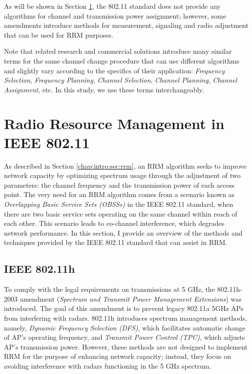 As will be shown in Section \ref{chap:lr:sec:rrm_80211}, the 802.11 standard does not provide any algorithms for channel and transmission power assignment; however, some amendments introduce methods for measurement, signaling and radio adjustment that can be used for RRM purposes.

Note that related research and commercial solutions introduce many similar terms for the same channel change procedure that can use different algorithms and slightly vary according to the specifics of their application: \textit{Frequency Selection}, \textit{Frequency Planning}, \textit{Channel Selection}, \textit{Channel Planning}, \textit{Channel Assignment}, etc. 
In this study, we use these terms interchangeably.

\section {Radio Resource Management in IEEE 802.11}
\label{chap:lr:sec:rrm_80211}
As described in Section \ref{chap:intro:sec:rrm}, an RRM algorithm seeks to improve network capacity by optimizing spectrum usage through the adjustment of two parameters: the channel frequency and the transmission power of each access point. The very need for an RRM algorithm comes from a scenario known as \textit{Overlapping Basic Service Sets (OBSSs)} in the IEEE 802.11 standard, when there are two basic service sets operating on the same channel within reach of each other. This scenario leads to co-channel interference, which degrades network performance. In this section, I provide an overview of the methods and techniques provided by the IEEE 802.11 standard that can assist in RRM.


\subsection {IEEE 802.11h}
\label{chap:lr:sec:80211h}
To comply with the legal requirements on transmissions at 5 GHz, the 802.11h-2003 \cite{ieee80211h} amendment (\textit{Spectrum and Transmit Power Management Extensions}) was introduced. The goal of this amendment is to prevent legacy 802.11a 5GHz APs from interfering with radars. 802.11h introduces \cite{konsgenSpectrumManagementAlgorithms2010} spectrum management methods, namely, \textit{Dynamic Frequency Selection (DFS)}, which facilitates automatic change of AP's operating frequency, and \textit{Transmit Power Control (TPC)}, which adjusts AP's transmission power.
However, these methods are not designed to implement RRM for the purpose of enhancing network capacity; instead, they focus on avoiding interference with radars functioning in the 5 GHz spectrum. 

